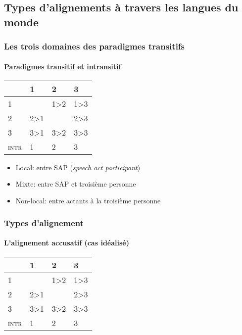 \subsection[Alignements]{Types d'alignements à travers les langues du monde}


\begin{frame} 
 \frametitle{Les trois domaines des paradigmes transitifs}
\framesubtitle{Paradigmes transitif et intransitif}
 \cite{zuniga06}
 \begin{table}[H] 
   \centering \label{tab:domain}
   \begin{tabular}{l|lll|} 
     \toprule
     &1 & 2 &3\\
     \midrule
     1 &\grise{} &1>2\cellcolor[wave]{465} & 1>3 \cellcolor[wave]{520} \\
     2&2>1\cellcolor[wave]{465}&\grise{}&2>3 \cellcolor[wave]{520} \\
     3&3>1 \cellcolor[wave]{520}&3>2 \cellcolor[wave]{520}&3>3\cellcolor[wave]{650}\\
     \midrule
     \textsc{intr}&1&2&3\\
     \bottomrule
   \end{tabular}
 \end{table}
 \begin{itemize}
 \item {\color[wave]{465} Local}: entre SAP (\textit{speech act participant})
 \item {\color[wave]{520} Mixte}: entre SAP et troisième personne
 \item {\color[wave]{650} Non-local}: entre actants à la troisième personne
 \end{itemize}
\end{frame} 

\begin{frame}
\frametitle{Types d'alignement}
\framesubtitle{L'alignement accusatif (cas idéalisé)}

\begin{table}[H] 
   \centering \label{tab:acc}
   \begin{tabular}{l|lll|} 
     \toprule
     &1 & 2 &3\\
     \midrule
     1 &\grise{} &1>2\cellcolor[wave]{465} & 1>3 \cellcolor[wave]{465} \\
     2&2>1\cellcolor[wave]{530}&\grise{}&2>3 \cellcolor[wave]{530} \\
     3&3>1 \cellcolor[wave]{630}&3>2 \cellcolor[wave]{630}&3>3\cellcolor[wave]{630}\\
     \midrule
     \textsc{intr}&\cellcolor[wave]{465}1&\cellcolor[wave]{530}2&\cellcolor[wave]{630}3\\
     \bottomrule
   \end{tabular}
 \end{table}

\end{frame}


